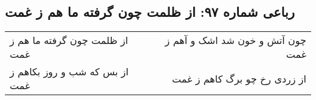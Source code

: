 \begin{center}
\section*{رباعی شماره ۹۷: از ظلمت چون گرفته ما هم ز غمت}
\label{sec:sh097}
\begin{longtable}{l p{0.5cm} r}
از ظلمت چون گرفته ما هم ز غمت
&&
چون آتش و خون شد اشک و آهم ز غمت
\\
از بس که شب و روز بکاهم ز غمت
&&
از زردی رخ چو برگ کاهم ز غمت
\\
\end{longtable}
\end{center}
